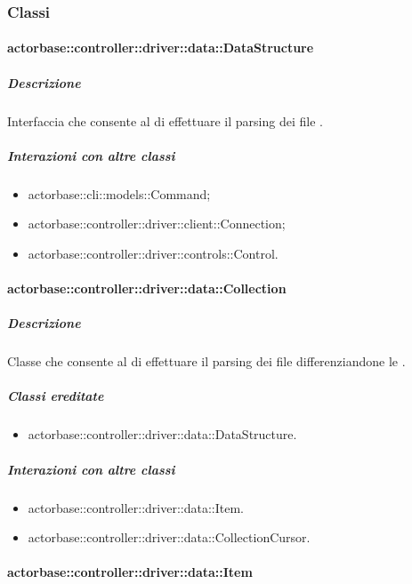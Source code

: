 \documentclass{scalatekids-article}
\begin{document}
\subsubsection{Classi}

\paragraph{actorbase::controller::driver::data::DataStructure}

\subparagraph{Descrizione}

Interfaccia che consente al  di effettuare il parsing dei file
.

\subparagraph{Interazioni con altre classi}

\begin{itemize}
\item actorbase::cli::models::Command;
\item actorbase::controller::driver::client::Connection;
\item actorbase::controller::driver::controls::Control.
\end{itemize}

\paragraph{actorbase::controller::driver::data::Collection}

\subparagraph{Descrizione}

Classe che consente al  di effettuare il parsing dei file
 differenziandone le .

\subparagraph{Classi ereditate}

\begin{itemize}
\item actorbase::controller::driver::data::DataStructure.
\end{itemize}

\subparagraph{Interazioni con altre classi}

\begin{itemize}
\item actorbase::controller::driver::data::Item.
\item actorbase::controller::driver::data::CollectionCursor.
\end{itemize}

\paragraph{actorbase::controller::driver::data::Item}
\end{document}
